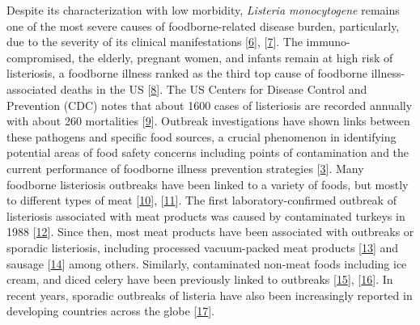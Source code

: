 \documentclass[
  10pt,
]{article}
\begin{document}
Despite its characterization with low morbidity, \emph{Listeria monocytogene} remains one of the most severe causes of foodborne-related disease burden, particularly, due to the severity of its clinical manifestations {[}\protect\hyperlink{ref-chlebicz2018campylobacteriosis}{6}{]}, {[}\protect\hyperlink{ref-filipello2020attribution}{7}{]}. The immuno-compromised, the elderly, pregnant women, and infants remain at high risk of listeriosis, a foodborne illness ranked as the third top cause of foodborne illness-associated deaths in the US {[}\protect\hyperlink{ref-lomonaco2015evolution}{8}{]}. The US Centers for Disease Control and Prevention (CDC) notes that about 1600 cases of listeriosis are recorded annually with about 260 mortalities {[}\protect\hyperlink{ref-cdc2022}{9}{]}. Outbreak investigations have shown links between these pathogens and specific food sources, a crucial phenomenon in identifying potential areas of food safety concerns including points of contamination and the current performance of foodborne illness prevention strategies {[}\protect\hyperlink{ref-tanui2022machine}{3}{]}. Many foodborne listeriosis outbreaks have been linked to a variety of foods, but mostly to different types of meat {[}\protect\hyperlink{ref-matle2020review}{10}{]}, {[}\protect\hyperlink{ref-hilliard2018genomic}{11}{]}. The first laboratory-confirmed outbreak of listeriosis associated with meat products was caused by contaminated turkeys in 1988 {[}\protect\hyperlink{ref-schwartz1989investigation}{12}{]}. Since then, most meat products have been associated with outbreaks or sporadic listeriosis, including processed vacuum-packed meat products {[}\protect\hyperlink{ref-chen2017prevalence}{13}{]} and sausage {[}\protect\hyperlink{ref-jensen2016molecular}{14}{]} among others. Similarly, contaminated non-meat foods including ice cream, and diced celery have been previously linked to outbreaks {[}\protect\hyperlink{ref-gaul2013hospital}{15}{]}, {[}\protect\hyperlink{ref-pouillot2016infectious}{16}{]}. In recent years, sporadic outbreaks of listeria have also been increasingly reported in developing countries across the globe {[}\protect\hyperlink{ref-de2014global}{17}{]}.
\end{document}
